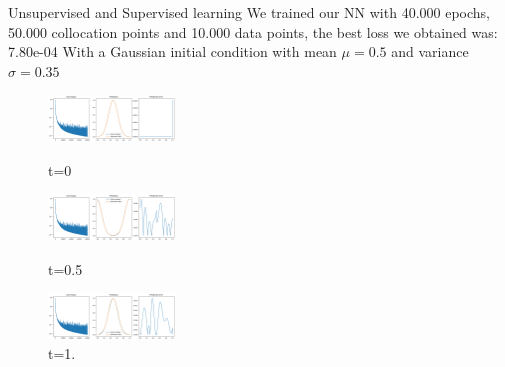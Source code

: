 \begin{frame}{Unsupervised and Supervised learning}
    We trained our NN with 40.000 epochs, 50.000 collocation points and 10.000 data points, the best loss we obtained was: 7.80e-04 With a Gaussian initial condition with mean $\mu= 0.5$ and variance $\sigma= 0.35$
    \begin{figure}
        \centering
        \includegraphics[width=0.3\textwidth]{images/r1.png}
        \caption{t=0}
        \includegraphics[width=0.3\textwidth]{images/r3.png}
        \caption{t=0.5}
        \includegraphics[width=0.3\textwidth]{images/r5.png}
        \caption{t=1.}
    \end{figure}
     
\end{frame}